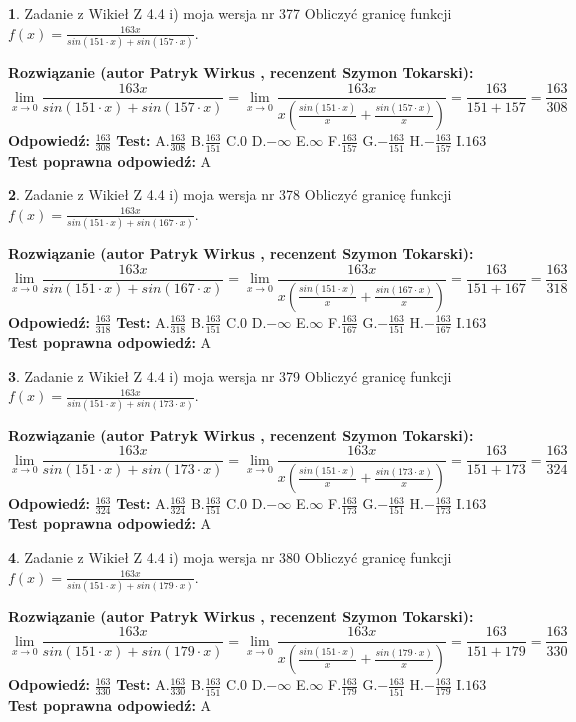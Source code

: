 \documentclass[12pt, a4paper]{article}
\theoremstyle{definition} %
\newtheorem{zad}{}
\newcommand{\zadStart}[1]{\begin{zad}#1\newline}
\newcommand{\zadStop}{\end{zad}}
\newcommand{\rozwStart}[2]{\noindent \textbf{Rozwiązanie (autor #1 , recenzent #2): }\newline}
\newcommand{\rozwStop}{\newline}
\newcommand{\odpStart}{\noindent \textbf{Odpowiedź:}\newline}
\newcommand{\odpStop}{\newline}
\newcommand{\testStart}{\noindent \textbf{Test:}\newline}
\newcommand{\testStop}{\newline}
\newcommand{\kluczStart}{\noindent \textbf{Test poprawna odpowiedź:}\newline}
\newcommand{\kluczStop}{\newline}
\begin{document}
\zadStart{Zadanie z Wikieł Z 4.4 i) moja wersja nr 377}
Obliczyć granicę funkcji $f(x)=\frac{163x}{sin(151\cdot x) +sin(157\cdot x)}$.
\zadStop
\rozwStart{Patryk Wirkus}{Szymon Tokarski}
$$\lim\limits_{x\to 0}\frac{163x}{sin(151\cdot x) +sin(157\cdot x)}=\lim\limits_{x\to 0}\frac{163x}{x(\frac{sin(151\cdot x)}{x}+\frac{sin(157\cdot x)}{x})}=\frac{163}{151+157} = \frac{163}{308}$$
\rozwStop
\odpStart
$\frac{163}{308}$
\odpStop
\testStart
A.$\frac{163}{308}$
B.$\frac{163}{151}$
C.$0$
D.$-\infty$
E.$\infty$
F.$\frac{163}{157}$
G.$-\frac{163}{151}$
H.$-\frac{163}{157}$
I.$163$
\testStop
\kluczStart
A
\kluczStop



\zadStart{Zadanie z Wikieł Z 4.4 i) moja wersja nr 378}
Obliczyć granicę funkcji $f(x)=\frac{163x}{sin(151\cdot x) +sin(167\cdot x)}$.
\zadStop
\rozwStart{Patryk Wirkus}{Szymon Tokarski}
$$\lim\limits_{x\to 0}\frac{163x}{sin(151\cdot x) +sin(167\cdot x)}=\lim\limits_{x\to 0}\frac{163x}{x(\frac{sin(151\cdot x)}{x}+\frac{sin(167\cdot x)}{x})}=\frac{163}{151+167} = \frac{163}{318}$$
\rozwStop
\odpStart
$\frac{163}{318}$
\odpStop
\testStart
A.$\frac{163}{318}$
B.$\frac{163}{151}$
C.$0$
D.$-\infty$
E.$\infty$
F.$\frac{163}{167}$
G.$-\frac{163}{151}$
H.$-\frac{163}{167}$
I.$163$
\testStop
\kluczStart
A
\kluczStop



\zadStart{Zadanie z Wikieł Z 4.4 i) moja wersja nr 379}
Obliczyć granicę funkcji $f(x)=\frac{163x}{sin(151\cdot x) +sin(173\cdot x)}$.
\zadStop
\rozwStart{Patryk Wirkus}{Szymon Tokarski}
$$\lim\limits_{x\to 0}\frac{163x}{sin(151\cdot x) +sin(173\cdot x)}=\lim\limits_{x\to 0}\frac{163x}{x(\frac{sin(151\cdot x)}{x}+\frac{sin(173\cdot x)}{x})}=\frac{163}{151+173} = \frac{163}{324}$$
\rozwStop
\odpStart
$\frac{163}{324}$
\odpStop
\testStart
A.$\frac{163}{324}$
B.$\frac{163}{151}$
C.$0$
D.$-\infty$
E.$\infty$
F.$\frac{163}{173}$
G.$-\frac{163}{151}$
H.$-\frac{163}{173}$
I.$163$
\testStop
\kluczStart
A
\kluczStop



\zadStart{Zadanie z Wikieł Z 4.4 i) moja wersja nr 380}
Obliczyć granicę funkcji $f(x)=\frac{163x}{sin(151\cdot x) +sin(179\cdot x)}$.
\zadStop
\rozwStart{Patryk Wirkus}{Szymon Tokarski}
$$\lim\limits_{x\to 0}\frac{163x}{sin(151\cdot x) +sin(179\cdot x)}=\lim\limits_{x\to 0}\frac{163x}{x(\frac{sin(151\cdot x)}{x}+\frac{sin(179\cdot x)}{x})}=\frac{163}{151+179} = \frac{163}{330}$$
\rozwStop
\odpStart
$\frac{163}{330}$
\odpStop
\testStart
A.$\frac{163}{330}$
B.$\frac{163}{151}$
C.$0$
D.$-\infty$
E.$\infty$
F.$\frac{163}{179}$
G.$-\frac{163}{151}$
H.$-\frac{163}{179}$
I.$163$
\testStop
\kluczStart
A
\kluczStop
\end{document}
